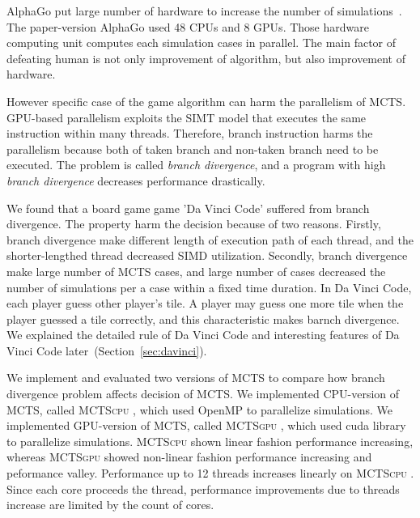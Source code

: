 \documentclass[conference]{IEEEtran}
\newcommand{\cpu} {\textsc{MCTScpu} }
\newcommand{\gpu} {\textsc{MCTSgpu} }
\begin{document}
AlphaGo put large number of hardware to increase the number of simulations~\cite{silver2016mastering_alphago}.
The paper-version AlphaGo used 48 CPUs and 8 GPUs.
Those hardware computing unit computes each simulation cases in parallel.
The main factor of defeating human is not only improvement of algorithm, but also improvement of hardware.

However specific case of the game algorithm can harm the parallelism of MCTS.
GPU-based parallelism exploits the SIMT model that executes the same instruction within many threads.
Therefore, branch instruction harms the parallelism because both of taken branch and non-taken branch need to be executed.
The problem is called \textit{branch divergence}, and a program with high \textit{branch divergence} decreases performance drastically.

We found that a board game game 'Da Vinci Code' suffered from branch divergence.
The property harm the decision because of two reasons.
Firstly, branch divergence make different length of execution path of each thread, and the shorter-lengthed thread decreased SIMD utilization.
Secondly, branch divergence make large number of MCTS cases, and large number of cases decreased the number of simulations per a case within a fixed time duration.
In Da Vinci Code, each player guess other player's tile.
A player may guess one more tile when the player guessed a tile correctly, and this characteristic makes barnch divergence.
We explained the detailed rule of Da Vinci Code and interesting features of Da Vinci Code later~(Section~\ref{sec:davinci}).


We implement and evaluated two versions of MCTS to compare how branch divergence problem affects decision of MCTS.
We implemented CPU-version of MCTS, called \cpu, which used OpenMP to parallelize simulations.
We implemented GPU-version of MCTS, called \gpu, which used cuda library to parallelize simulations.
\cpu shown linear fashion performance increasing, whereas \gpu showed non-linear fashion performance increasing and peformance valley.
Performance up to 12 threads increases linearly on \cpu.
Since each core proceeds the thread, performance improvements due to threads increase are limited by the count of cores.
\end{document}
